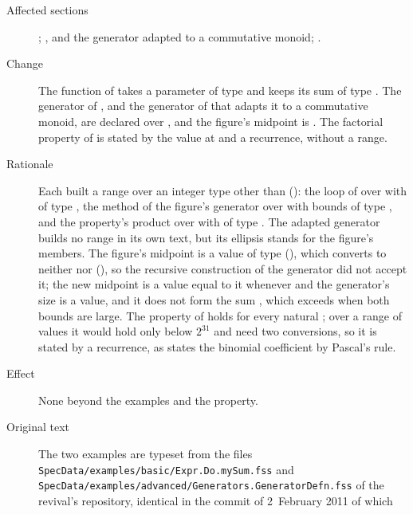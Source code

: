 \begin{description}
\item[Affected sections] ; ,
 and the generator adapted to a commutative monoid;
.
\item[Change] The function  of  takes a parameter
of type  and keeps its sum of type .
The generator of , and the generator of
 that adapts it to a commutative monoid, are
declared over , and the figure's midpoint is
.
The factorial property of  is stated by the value at  and
a recurrence, without a range.
\item[Rationale] Each built a range over an integer type other than
 (): the loop of  over
 with  of type , the method
 of the figure's generator over  with
bounds of type , and the property's product over
 with  of type . The adapted generator
builds no range in its own text, but its ellipsis stands for the figure's
members.
The figure's midpoint  is a
value of type  (), which converts to
neither  nor  (), so
the recursive construction of the generator did not accept it; the new
midpoint is a  value equal to it whenever 
and the generator's size  is a  value, and
it does not form the sum , which exceeds 
when both bounds are large.
The property of  holds for every natural ; over a range
of  values it would hold only below $2^{31}$ and need two
conversions, so it is stated by a recurrence, as  states
the binomial coefficient by Pascal's rule.
\item[Effect] None beyond the examples and the property.
\item[Original text] The two examples are typeset from the files
\nolinkurl{SpecData/examples/basic/Expr.Do.mySum.fss} and
\nolinkurl{SpecData/examples/advanced/Generators.GeneratorDefn.fss} of the
revival's repository, identical in the commit of 2~February 2011 of which

\end{description}
